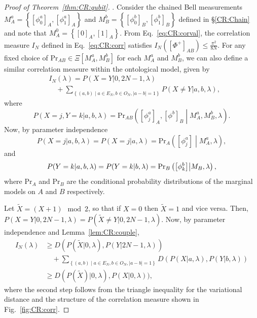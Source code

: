 \documentclass[DIV=calc,paper=a4,fontsize=11pt,twocolumn]{scrartcl} %
\theoremstyle{definition}
\theoremstyle{plain}
\newcommand{\Proj}[1]{\ensuremath{\left [ #1 \right ]}}
\begin{document}
\begin{proof}[Proof of Theorem~\ref{thm:CR:qubit}].  Consider the
chained Bell measurements $M^a_A = \left \{ \Proj{\phi^a_0}_A,
\Proj{\phi^a_1}_A \right \}$ and $M^b_B = \left \{
\Proj{\phi^b_0}_B,\allowbreak \Proj{\phi^b_1}_B\right \}$ defined
in \S\ref{CR:Chain} and note that $M^0_A = \left \{ \Proj{0}_A,
\Proj{1}_A \right \}$.  From Eq.~\eqref{eq:CR:corval}, the
correlation measure $I_N$ defined in Eq.~\eqref{eq:CR:corr}
satisfies $I_N \left ( \Proj{\Phi^+}_{AB} \right ) \leq
\frac{\pi^2}{8N}$.  For any fixed choice of $\text{Pr}_{AB} \in
\Xi[M_A^a,M_B^b]$ for each $M^a_A$ and $M^b_B$, we can also define a
similar correlation measure within the ontological model, given by
\begin{align}
\label{eq:CR:corront}
&I_N(\lambda) = P(X=Y|0,2N-1,\lambda) \nonumber\\
&\quad + \sum_{\left \{(a,b)
\middle | a \in E_N, b \in O_N, |a-b| = 1 \right \}} P(X \neq
Y|a,b,\lambda),
\end{align}
where
\begin{equation}
P(X=j,Y=k|a,b,\lambda) = \text{Pr}_{AB} \left ( \Proj{\phi^a_j}_A,
\Proj{\phi^b}_B \middle | M^a_A,M^b_B,\lambda \right ).
\end{equation}
Now, by parameter independence
\begin{equation}
\label{eq:CR:presponse1}
P(X = j|a,b,\lambda) = P(X = j|a,\lambda) =
\text{Pr}_A \left ( \Proj{\phi^a_j} \middle | M_A^a,\lambda \right ),
\end{equation}
and
\begin{equation}
\label{eq:CR:presponse2}
P(Y = k|a,b,\lambda) = P(Y = k|b,\lambda) \\ =
\text{Pr}_B \left ( \Proj{\phi^b_k} \middle | M_B, \lambda \right ),
\end{equation}
where $\text{Pr}_A$ and $\text{Pr}_B$ are the conditional
probability distributions of the marginal models on $A$ and $B$
respectively.

Let $\tilde{X} = (X + 1) \mod 2$, so that if $X = 0$ then $\tilde{X}
= 1$ and vice versa.  Then, $P(X=Y|0,2N-1,\lambda) = P(\tilde{X}
\neq Y|0,2N-1,\lambda)$.  Now, by parameter independence and
Lemma~\ref{lem:CR:couple},
\begin{align}
I_N(\lambda) & \geq D(P(\tilde{X}|0,\lambda), P(Y|2N-1,\lambda)) \nonumber\\
&\quad +
\sum_{\left \{(a,b) \middle | a \in E_N, b \in O_N, |a-b| = 1
\right \}}
D(P(X|a,\lambda), P(Y|b,\lambda)) \\
& \geq D(P(\tilde{X})|0,\lambda),
P(X|0,\lambda)), \label{eq:CR:ontcor}
\end{align}
where the second step follows from the triangle inequality for the
variational distance and the structure of the correlation measure
shown in Fig.~\ref{fig:CR:corr}.


\end{proof}
\end{document}
